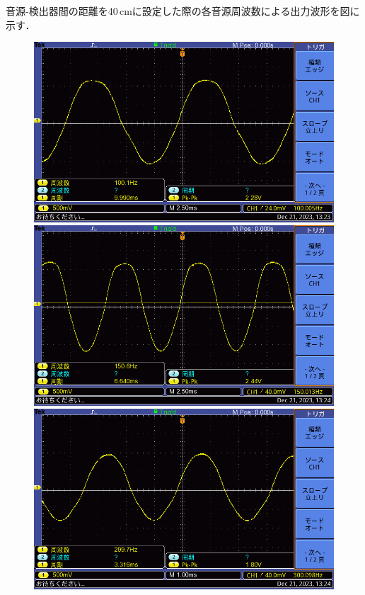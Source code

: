 \documentclass{ltjsarticle}
\begin{document}
\clearpage
			音源-検出器間の距離を40\,cmに設定した際の各音源周波数による出力波形を図に示す．
			\begin{figure}[H]
			\centering
			\begin{minipage}{0.4\columnwidth}
			\centering
			\includegraphics[width = \columnwidth]{figs/F0031TEK.PNG}
			\end{minipage}
			\hspace{0.04\columnwidth}
			\begin{minipage}{0.4\columnwidth}
			\centering
			\includegraphics[width = \columnwidth]{figs/F0032TEK.PNG}
			\end{minipage}
			\hspace{0.04\columnwidth}
			\begin{minipage}{0.4\columnwidth}
			\centering
			\includegraphics[width = \columnwidth]{figs/F0033TEK.PNG}

\end{minipage}
\end{figure}
\end{document}
